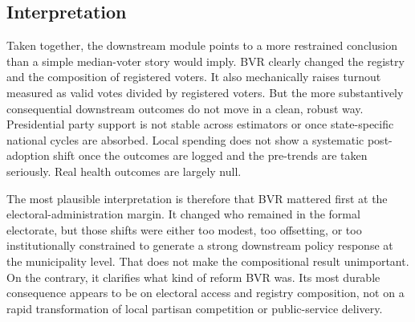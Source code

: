 \subsection{Interpretation}

Taken together, the downstream module points to a more restrained conclusion than a simple median-voter story would imply. BVR clearly changed the registry and the composition of registered voters. It also mechanically raises turnout measured as valid votes divided by registered voters. But the more substantively consequential downstream outcomes do not move in a clean, robust way. Presidential party support is not stable across estimators or once state-specific national cycles are absorbed. Local spending does not show a systematic post-adoption shift once the outcomes are logged and the pre-trends are taken seriously. Real health outcomes are largely null.

The most plausible interpretation is therefore that BVR mattered first at the electoral-administration margin. It changed who remained in the formal electorate, but those shifts were either too modest, too offsetting, or too institutionally constrained to generate a strong downstream policy response at the municipality level. That does not make the compositional result unimportant. On the contrary, it clarifies what kind of reform BVR was. Its most durable consequence appears to be on electoral access and registry composition, not on a rapid transformation of local partisan competition or public-service delivery.
